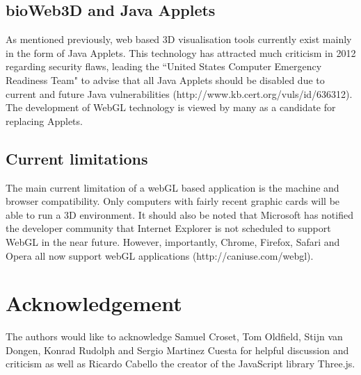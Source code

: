 \documentclass{bioinfo}
\begin{document}
	\subsection{bioWeb3D and Java Applets}
As mentioned previously, web based 3D visualisation tools currently exist mainly in the form of Java Applets. This technology has attracted much criticism in 2012 regarding security flaws, leading the ``United States Computer Emergency Readiness Team" to advise that all Java Applets should be disabled due to current and future Java vulnerabilities (http://www.kb.cert.org/vuls/id/636312). The development of WebGL technology is viewed by many as a candidate for replacing Applets. 

	\subsection{Current limitations}
The main current limitation of a webGL based application is the machine and browser compatibility. Only computers with fairly recent graphic cards will be able to run a 3D environment. It should also be noted that Microsoft has notified the developer community that Internet Explorer is not scheduled to support WebGL in the near future. However, importantly, Chrome, Firefox, Safari and Opera all now support webGL applications (http://caniuse.com/webgl).



\section*{Acknowledgement}
The authors would like to acknowledge Samuel Croset, Tom Oldfield, Stijn van Dongen, Konrad Rudolph and Sergio Martinez Cuesta for helpful discussion and criticism as well as Ricardo Cabello the creator of the JavaScript library Three.js.

%
%
%
%
%

%

%
\end{document}

